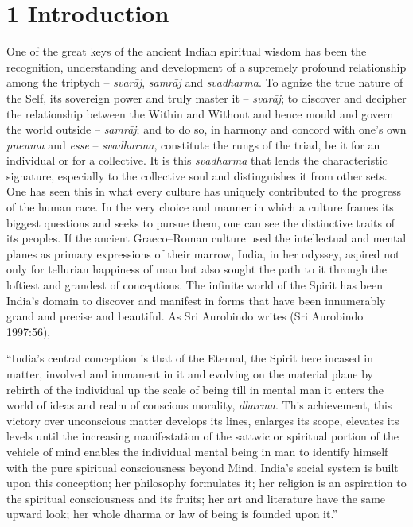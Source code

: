 \section*{1 Introduction}

One of the great keys of the ancient Indian spiritual wisdom has been the recognition, understanding and development of a supremely profound relationship among the triptych – \textit{svarāj}, \textit{samrāj} and \textit{svadharma}. To agnize the true nature of the Self, its sovereign power and truly master it – \textit{svarāj}; to discover and decipher the relationship between the Within and Without and hence mould and govern the world outside – \textit{samrāj}; and to do so, in harmony and concord with one’s own \textit{pneuma} and \textit{esse} – \textit{svadharma}, constitute the rungs of the triad, be it for an individual or for a collective. It is this \textit{svadharma} that lends the characteristic signature, especially to the collective soul and distinguishes it from other sets. One has seen this in what every culture has uniquely contributed to the progress of the human race. In the very choice and manner in which a culture frames its biggest questions and seeks to pursue them, one can see the distinctive traits of its peoples. If the ancient Graeco–Roman culture used the intellectual and mental planes as primary expressions of their marrow, India, in her odyssey, aspired not only for tellurian happiness of man but also sought the path to it through the loftiest and grandest of conceptions. The infinite world of the Spirit has been India’s domain to discover and manifest in forms that have been innumerably grand and precise and beautiful. As Sri Aurobindo writes (Sri Aurobindo 1997:56),

\begin{myquote}
“India’s central conception is that of the Eternal, the Spirit here incased in matter, involved and immanent in it and evolving on the material plane by rebirth of the individual up the scale of being till in mental man it enters the world of ideas and realm of conscious morality, \textit{dharma}. This achievement, this victory over unconscious matter develops its lines, enlarges its scope, elevates its levels until the increasing manifestation of the sattwic or spiritual portion of the vehicle of mind enables the individual mental being in man to identify himself with the pure spiritual consciousness beyond Mind. India’s social system is built upon this conception; her philosophy formulates it; her religion is an aspiration to the spiritual consciousness and its fruits; her art and literature have the same upward look; her whole dharma or law of being is founded upon it.”
\end{myquote}

